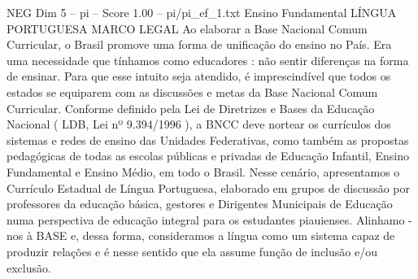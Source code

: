 \begin{textsample}{NEG Dim 5 – pi – Score 1.00 – pi/pi\_ef\_1.txt}  \label{ex:f5_neg_058}
Ensino Fundamental LÍNGUA PORTUGUESA MARCO LEGAL Ao elaborar a Base Nacional Comum Curricular, o Brasil promove uma forma de unificação do ensino no País.
Era uma necessidade que tínhamos como educadores : não sentir diferenças na forma de ensinar.
Para que esse intuito seja atendido, é imprescindível que todos os estados se equiparem com as discussões e metas da Base Nacional Comum Curricular.
Conforme definido pela Lei de Diretrizes e Bases da Educação Nacional ( LDB, Lei nº 9.394/1996 ), a BNCC deve nortear os currículos dos sistemas e redes de ensino das Unidades Federativas, como também as propostas pedagógicas de todas as escolas públicas e privadas de Educação Infantil, Ensino Fundamental e Ensino Médio, em todo o Brasil.
Nesse cenário, apresentamos o Currículo Estadual de Língua Portuguesa, elaborado em grupos de discussão por professores da educação básica, gestores e Dirigentes Municipais de Educação numa perspectiva de educação integral para os estudantes piauienses.
Alinhamo -nos à BASE e, dessa forma, consideramos a língua como um sistema capaz de produzir relações e é nesse sentido que ela assume função de inclusão e/ou exclusão.

\end{textsample}
